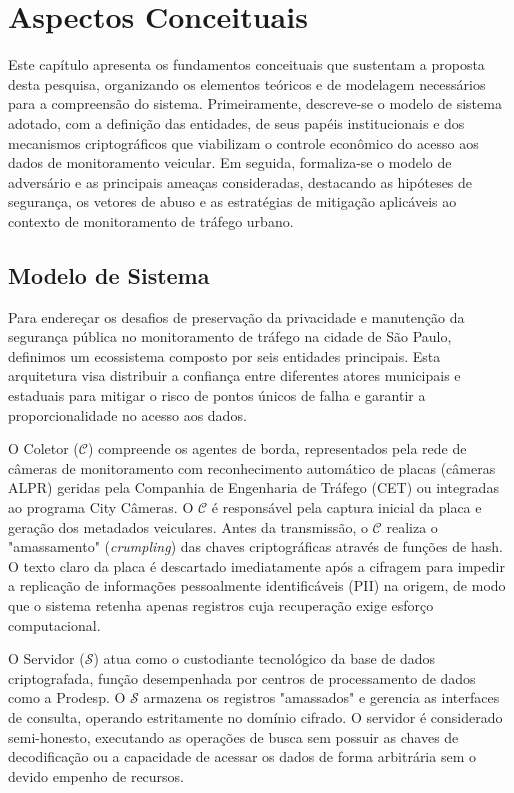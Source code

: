 \chapter{Aspectos Conceituais} \label{cap:conceitos}

Este capítulo apresenta os fundamentos conceituais que sustentam a proposta desta pesquisa, organizando os elementos teóricos e de modelagem necessários para a compreensão do sistema. Primeiramente, descreve-se o modelo de sistema adotado, com a definição das entidades, de seus papéis institucionais e dos mecanismos criptográficos que viabilizam o controle econômico do acesso aos dados de monitoramento veicular. Em seguida, formaliza-se o modelo de adversário e as principais ameaças consideradas, destacando as hipóteses de segurança, os vetores de abuso e as estratégias de mitigação aplicáveis ao contexto de monitoramento de tráfego urbano.

\section{Modelo de Sistema}
Para endereçar os desafios de preservação da privacidade e manutenção da segurança pública no monitoramento de tráfego na cidade de São Paulo, definimos um ecossistema composto por seis entidades principais. Esta arquitetura visa distribuir a confiança entre diferentes atores municipais e estaduais para mitigar o risco de pontos únicos de falha e garantir a proporcionalidade no acesso aos dados.

O Coletor ($\mathcal{C}$) compreende os agentes de borda, representados pela rede de câmeras de monitoramento com reconhecimento automático de placas (câmeras ALPR) geridas pela Companhia de Engenharia de Tráfego (CET) ou integradas ao programa City Câmeras. O $\mathcal{C}$ é responsável pela captura inicial da placa e geração dos metadados veiculares. Antes da transmissão, o $\mathcal{C}$ realiza o "amassamento" (\textit{crumpling}) das chaves criptográficas através de funções de hash. O texto claro da placa é descartado imediatamente após a cifragem para impedir a replicação de informações pessoalmente identificáveis (PII) na origem, de modo que o sistema retenha apenas registros cuja recuperação exige esforço computacional.

O Servidor ($\mathcal{S}$) atua como o custodiante tecnológico da base de dados criptografada, função desempenhada por centros de processamento de dados como a Prodesp. O $\mathcal{S}$ armazena os registros "amassados" e gerencia as interfaces de consulta, operando estritamente no domínio cifrado. O servidor é considerado semi-honesto, executando as operações de busca sem possuir as chaves de decodificação ou a capacidade de acessar os dados de forma arbitrária sem o devido empenho de recursos.


